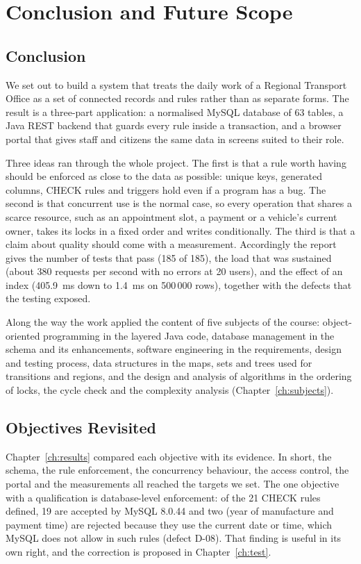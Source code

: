 \chapter{Conclusion and Future Scope}\label{ch:conclusion}

\section{Conclusion}
We set out to build a system that treats the daily work of a Regional Transport Office as
a set of connected records and rules rather than as separate forms. The result is a
three-part application: a normalised MySQL database of 63 tables, a Java REST backend
that guards every rule inside a transaction, and a browser portal that gives staff and
citizens the same data in screens suited to their role.

Three ideas ran through the whole project. The first is that a rule worth having should be
enforced as close to the data as possible: unique keys, generated columns, CHECK rules and
triggers hold even if a program has a bug. The second is that concurrent use is the normal
case, so every operation that shares a scarce resource, such as an appointment slot, a
payment or a vehicle's current owner, takes its locks in a fixed order and writes
conditionally. The third is that a claim about quality should come with a measurement.
Accordingly the report gives the number of tests that pass (185 of 185), the load that was
sustained (about 380 requests per second with no errors at 20 users), and the effect of
an index (405.9~ms down to 1.4~ms on 500\,000 rows), together with the defects that the
testing exposed.

Along the way the work applied the content of five subjects of the course: object-oriented
programming in the layered Java code, database management in the schema and its
enhancements, software engineering in the requirements, design and testing process, data
structures in the maps, sets and trees used for transitions and regions, and the design and
analysis of algorithms in the ordering of locks, the cycle check and the complexity analysis
(Chapter~\ref{ch:subjects}).

\section{Objectives Revisited}
Chapter~\ref{ch:results} compared each objective with its evidence. In short, the schema,
the rule enforcement, the concurrency behaviour, the access control, the portal and the
measurements all reached the targets we set. The one objective with a qualification is
database-level enforcement: of the 21 CHECK rules defined, 19 are accepted by MySQL 8.0.44
and two (year of manufacture and payment time) are rejected because they use the current
date or time, which MySQL does not allow in such rules (defect D-08). That finding is
useful in its own right, and the correction is proposed in Chapter~\ref{ch:test}.

